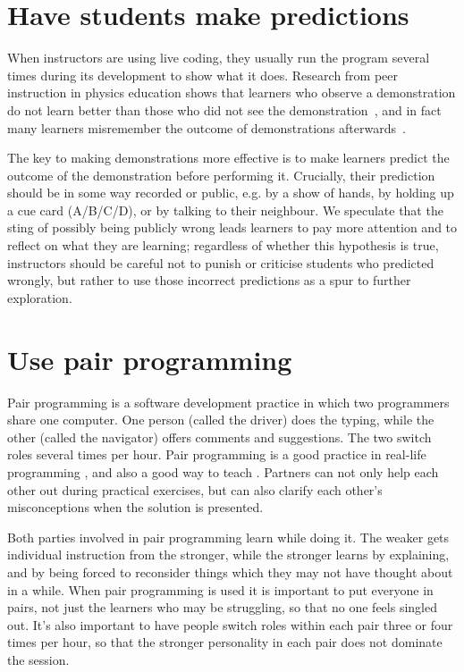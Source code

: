 \documentclass{article}
\begin{document}
\section{Have students make predictions}\label{predictions}

When instructors are using live coding,
they usually run the program several times during its development to show what it does.
Research from peer instruction in physics education shows that
learners who observe a demonstration do not learn better than
those who did not see the demonstration~\citep{crouch-demo},
and in fact many learners misremember the outcome of demonstrations afterwards~\citep{miller-demo}.

The key to making demonstrations more effective is
to make learners predict the outcome of the demonstration before performing it.
Crucially, their prediction should be in some way recorded or public,
e.g. by a show of hands,
by holding up a cue card (A/B/C/D),
or by talking to their neighbour.
We speculate that the sting of possibly being publicly wrong leads learners to pay more attention
and to reflect on what they are learning;
regardless of whether this hypothesis is true,
instructors should be careful not to punish or criticise students who predicted wrongly,
but rather to use those incorrect predictions as a spur to further exploration.

\section{Use pair programming}\label{pair-programming}

Pair programming is a software development practice
in which two programmers share one computer.
One person (called the driver) does the typing,
while the other (called the navigator) offers comments and suggestions.
The two switch roles several times per hour.
Pair programming is a good practice in real-life programming \cite{hannay},
and also a good way to teach \cite{mcdowell}.
Partners can not only help each other out during practical exercises,
but can also clarify each other's misconceptions when the solution is presented.

Both parties involved in pair programming learn while doing it.
The weaker gets individual instruction from the stronger,
while the stronger learns by explaining,
and by being forced to reconsider things which they may not have thought about in a while.
When pair programming is used it is important to put everyone in pairs,
not just the learners who may be struggling,
so that no one feels singled out.
It's also important to have people switch roles within each pair three or four times per hour,
so that the stronger personality in each pair does not dominate the session.
\end{document}
